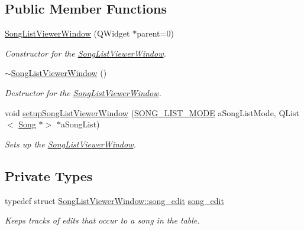 \subsection*{Public Member Functions}
\begin{DoxyCompactItemize}
\item 
\mbox{\hyperlink{class_song_list_viewer_window_a5691d305c3ccaeea7e0213c1722c5c38}{Song\+List\+Viewer\+Window}} (Q\+Widget $\ast$parent=0)
\begin{DoxyCompactList}\small\item\em Constructor for the \mbox{\hyperlink{class_song_list_viewer_window}{Song\+List\+Viewer\+Window}}. \end{DoxyCompactList}\item 
\mbox{\hyperlink{class_song_list_viewer_window_a563ac79baf2458f7f33c961fb433541d}{$\sim$\+Song\+List\+Viewer\+Window}} ()
\begin{DoxyCompactList}\small\item\em Destructor for the \mbox{\hyperlink{class_song_list_viewer_window}{Song\+List\+Viewer\+Window}}. \end{DoxyCompactList}\item 
void \mbox{\hyperlink{class_song_list_viewer_window_ae26127c85ed57885461c5143be4ae1e9}{setup\+Song\+List\+Viewer\+Window}} (\mbox{\hyperlink{class_song_list_viewer_window_a6f23a68c416173f6b571a2cc4990a927}{S\+O\+N\+G\+\_\+\+L\+I\+S\+T\+\_\+\+M\+O\+DE}} a\+Song\+List\+Mode, Q\+List$<$ \mbox{\hyperlink{class_song}{Song}} $\ast$$>$ $\ast$a\+Song\+List)
\begin{DoxyCompactList}\small\item\em Sets up the \mbox{\hyperlink{class_song_list_viewer_window}{Song\+List\+Viewer\+Window}}. \end{DoxyCompactList}\end{DoxyCompactItemize}
\subsection*{Private Types}
\begin{DoxyCompactItemize}
\item 
typedef struct \mbox{\hyperlink{struct_song_list_viewer_window_1_1song__edit}{Song\+List\+Viewer\+Window\+::song\+\_\+edit}} \mbox{\hyperlink{class_song_list_viewer_window_a9d231624b8aaaceace0c6c3e1e389893}{song\+\_\+edit}}
\begin{DoxyCompactList}\small\item\em Keeps tracks of edits that occur to a song in the table. \end{DoxyCompactList}\end{DoxyCompactItemize}
